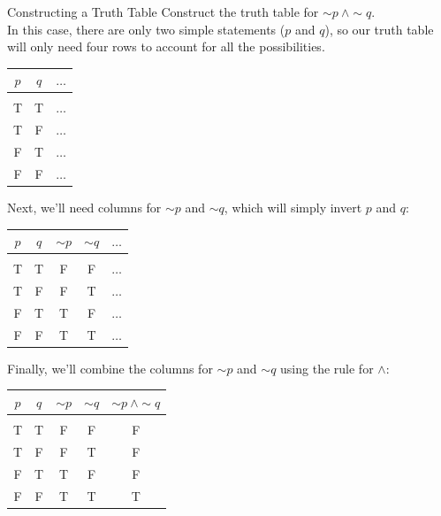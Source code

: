 \begin{example}[https://www.youtube.com/watch?v=cIO6rLWEruw]{Constructing a Truth Table}
Construct the truth table for $\sim p\ \wedge \sim q$.\\

\sol
In this case, there are only two simple statements ($p$ and $q$), so our truth table will only need four rows to account for all the possibilities.
\begin{center}
\begin{tabular}{|c c c|}
\hline
$p$ & $q$ & $\ldots$\\
\hline
& &\\
T & T & $\ldots$\\
T & F & $\ldots$\\
F & T & $\ldots$\\
F & F & $\ldots$\\
\hline
\end{tabular}
\end{center}

Next, we'll need columns for $\sim p$ and $\sim q$, which will simply invert $p$ and $q$:
\begin{center}
\begin{tabular}{|c c c c c|}
\hline
$p$ & $q$ & $\sim p$ & $\sim q$ & $\ldots$\\
\hline
& & & &\\
T & T & F & F & $\ldots$\\
T & F & F & T & $\ldots$\\
F & T & T & F & $\ldots$\\
F & F & T & T & $\ldots$\\
\hline
\end{tabular}
\end{center}
\pagebreak

Finally, we'll combine the columns for $\sim p$ and $\sim q$ using the rule for $\wedge$:
\begin{center}
{\color{green!30!black}
\begin{tabular}{|c c c c c|}
\hline
$p$ & $q$ & $\sim p$ & $\sim q$ & $\sim p\ \wedge \sim q$\\
\hline
& & & &\\
T & T & F & F & F\\
T & F & F & T & F\\
F & T & T & F & F\\
F & F & T & T & T\\
\hline
\end{tabular}}
\end{center}
\end{example}

